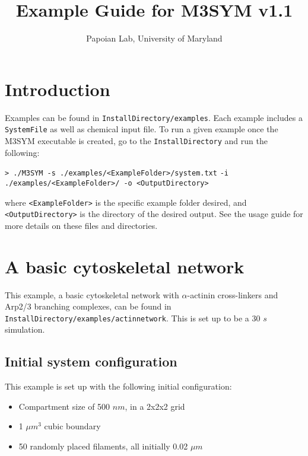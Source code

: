 \documentclass[11pt, oneside]{article}   	%
\title{Example Guide for M3SYM v1.1}
\author{Papoian Lab, University of Maryland}
\date{}							%
\begin{document}
\maketitle

\tableofcontents
\newpage

\section{Introduction}

Examples can be found in \texttt{InstallDirectory/examples}. Each example includes a \texttt{SystemFile} as well as chemical input file. To run a given example once the M3SYM executable is created, go to the \texttt{InstallDirectory} and run the following:\newline

\indent \texttt{> ./M3SYM -s ./examples/<ExampleFolder>/system.txt}\newline
\indent\indent \texttt{-i ./examples/<ExampleFolder>/  -o <OutputDirectory>}\newline

\noindent where \texttt{<ExampleFolder>} is the specific example folder desired, and \texttt{<OutputDirectory>} is the directory of the desired output. See the usage guide for more details on these files and directories.


\section{A basic cytoskeletal network}

This example, a basic cytoskeletal network with $\alpha$-actinin cross-linkers and Arp2/3 branching complexes, can be found in
\texttt{InstallDirectory/examples/actinnetwork}. This is set up to be a 30 $s$ simulation.

\subsection{Initial system configuration}
 
 This example is set up with the following initial configuration:
 
 \begin{itemize}
 \item Compartment size of 500 $nm$, in a 2x2x2 grid 
 \item 1 $\mu m ^3$ cubic boundary
 \item 50 randomly placed filaments, all initially 0.02 $\mu m$
 \end{itemize}
\end{document}
